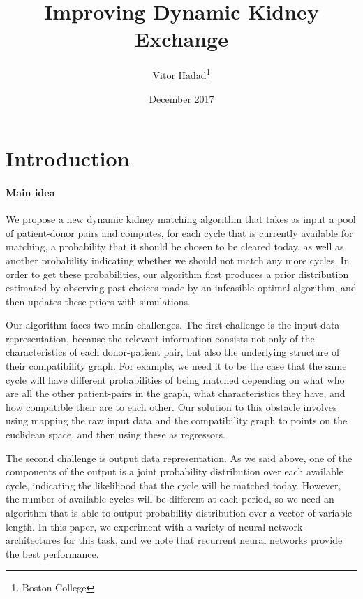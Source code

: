 \documentclass[12pt]{article}
\begin{document}
\begin{titlepage}
\title{Improving Dynamic Kidney Exchange}
\author{Vitor Hadad\thanks{Boston College}} 
\date{December 2017}
\maketitle
\begin{abstract}

\bigskip
\end{abstract}
\setcounter{page}{0}
\thispagestyle{empty}
\end{titlepage}
\pagebreak 

\doublespacing


\section{Introduction} \label{sec:introduction}


\paragraph{Main idea} We propose a new dynamic kidney matching algorithm that takes as input a pool of patient-donor pairs and computes, for each cycle that is currently available for matching, a probability that it should be chosen to be cleared today, as well as another probability indicating whether we should not match any more cycles. In order to get these probabilities, our algorithm first produces a prior distribution estimated by observing past choices made by an infeasible optimal algorithm, and then updates these priors with simulations. 

Our algorithm faces two main challenges. The first challenge is the input data representation, because the relevant information consists not only of the characteristics of each donor-patient pair, but also the underlying structure of their compatibility graph. For example, we need it to be the case that the same cycle will have different probabilities of being matched depending on what who are all the other patient-pairs in the graph, what characteristics they have, and how compatible their are to each other. Our solution to this obstacle involves using mapping the raw input data and the compatibility graph to points on the euclidean space, and then using these as regressors.

The second challenge is output data representation. As we said above, one of the components of the output is a joint probability distribution over each available cycle, indicating the likelihood that the cycle will be matched today. However, the number of available cycles will be different at each period, so we need an algorithm that is able to output probability distribution over a vector of variable length. In this paper, we experiment with a variety of neural network architectures for this task, and we note that recurrent neural networks provide the best performance.
\end{document}
